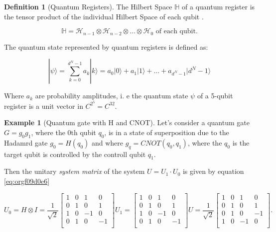 \documentclass[11pt]{article}
\providecommand{\ket}[1]{|#1\rangle}
\theoremstyle{definition}
\newtheorem{exmp}{Example}[section]
\theoremstyle{definition}
\newtheorem{definition}{Definition}[section]
\begin{document}
\begin{definition}[Quantum Registers]
    The Hilbert Space $\mathbb{H}$ of a quantum register is the tensor product
    of the individual Hilbert Space of each qubit \cite{werth_charged_2009}.



    \begin{equation}
\mathbb{H} = \mathcal{H}_{n-1} \otimes \mathcal{H}_{n-2} \otimes \ldots \otimes \mathcal{H}_{0} \text{ of each qubit}.
    \end{equation}

    The quantum state represented by quantum registers is defined as:

    \begin{equation}
    \ket{\psi} = \sum_{k=0}^{d^N-1} a_k \ket{k} = a_0\ket{0} + a_1\ket{1} + \dots + a_{d^N-1}\ket{d^N-1}
    \end{equation}
    \end{definition}

Where \(a_k\) are probability amplitudes, i. e the quantum state \(\psi\) of a 5-qubit register is a unit vector in
\(C^{2^5} = C^{32}\).


\begin{exmp}[Quantum gate with H and CNOT]
Let's consider a quantum gate $G= g_0 g_1$, where the 0th qubit $q_0$, 
is in a state of superposition due to the Hadamrd gate $g_0 = H(q_0)$ and 
where $g_q = CNOT(q_0, q_1)$, where the $q_0$ is the target qubit is controlled by 
the controll qubit $q_1$.
\end{exmp}

Then the unitary \emph{system matrix} of the system \(U = U_1 \cdot U_0\)
is given by equation \ref{eq:orgf09d0e6}

\begin{equation}
U_0 = H \otimes I = \frac{1}{\sqrt{2}}\begin{bmatrix}
 1 & 0 & 1 & 0 \\[0pt]
 0 & 1 & 0 & 1 \\[0pt]
 1 & 0 & -1 & 0 \\[0pt]
 0 & 1 & 0 & -1 \\[0pt]
\end{bmatrix}U_1 =
\begin{bmatrix}
 1 & 0 & 1 & 0 \\[0pt]
 0 & 1 & 0 & 1 \\[0pt]
 1 & 0 & -1 & 0 \\[0pt]
 0 & 1 & 0 & -1 \\[0pt]
\end{bmatrix}U = \frac{1}{\sqrt{2}}
\begin{bmatrix}
 1 & 0 & 1 & 0 \\[0pt]
 0 & 1 & 0 & 1 \\[0pt]
 0 & 1 & 0 & -1 \\[0pt]
 1 & 0 & -1 & 0 \\[0pt]
\end{bmatrix}.
\label{eq:orgf09d0e6}
\end{equation}
\end{document}
